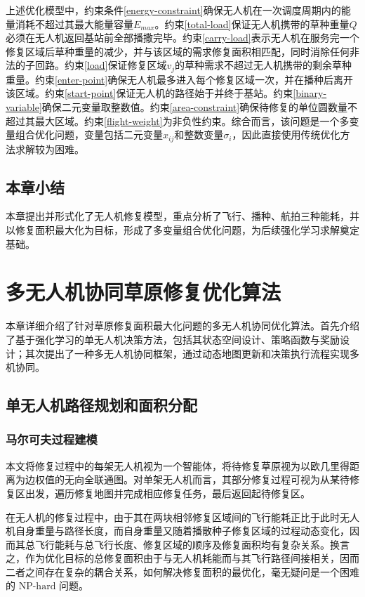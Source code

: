 \documentclass[AutoFakeBold]{LZUThesis}
\begin{document}
上述优化模型中，约束条件\eqref{energy-constraint}确保无人机在一次调度周期内的能量消耗不超过其最大能量容量$E_{max}$。约束\eqref{total-load}保证无人机携带的草种重量$Q$必须在无人机返回基站前全部播撒完毕。约束\eqref{carry-load}表示无人机在服务完一个修复区域后草种重量的减少，并与该区域的需求修复面积相匹配，同时消除任何非法的子回路。约束\eqref{load}保证修复区域$v_j$的草种需求不超过无人机携带的剩余草种重量。约束\eqref{enter-point}确保无人机最多进入每个修复区域一次，并在播种后离开该区域。约束\eqref{start-point}保证无人机的路径始于并终于基站。约束\eqref{binary-variable}确保二元变量取整数值。约束\eqref{area-constraint}确保待修复的单位圆数量不超过其最大区域。约束\eqref{flight-weight}为非负性约束。综合而言，该问题是一个多变量组合优化问题，变量包括二元变量$x_{ij}$和整数变量$\sigma_i$，因此直接使用传统优化方法求解较为困难。


\section{本章小结}
本章提出并形式化了无人机修复模型，重点分析了飞行、播种、航拍三种能耗，并以修复面积最大化为目标，形成了多变量组合优化问题，为后续强化学习求解奠定基础。


\chapter{多无人机协同草原修复优化算法}

本章详细介绍了针对草原修复面积最大化问题的多无人机协同优化算法。首先介绍了基于强化学习的单无人机决策方法，包括其状态空间设计、策略函数与奖励设计；其次提出了一种多无人机协同框架，通过动态地图更新和决策执行流程实现多机协同。


\section{单无人机路径规划和面积分配}

\subsection{马尔可夫过程建模}
本文将修复过程中的每架无人机视为一个智能体，将待修复草原视为以欧几里得距离为边权值的无向全联通图。对单架无人机而言，其部分修复过程可视为从某待修复区出发，遍历修复地图并完成相应修复任务，最后返回起待修复区。

在无人机的修复过程中，由于其在两块相邻修复区域间的飞行能耗正比于此时无人机自身重量与路径长度，而自身重量又随着播散种子修复区域的过程动态变化，因而其总飞行能耗与总飞行长度、修复区域的顺序及修复面积均有复杂关系。换言之，作为优化目标的总修复面积由于与无人机耗能而与其飞行路径间接相关，因而二者之间存在复杂的耦合关系，如何解决修复面积的最优化，毫无疑问是一个困难的 $\text{NP-hard}$ 问题。
\end{document}
